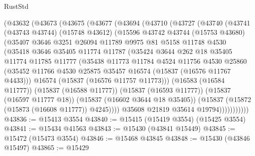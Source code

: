 \begin{lexlean}{RustStd}
\begin{coremodule}
{\begin{coremodule}
{{{{{{{{{{{{{{{{{{{{{{{{{{{{{{{{{{{{{{{{{{{{{{{{{{{{{{{{{{{{    (@43632
      (@43673
        (@43675
          (@43677
            (@43694
              (@43710
                (@43727
                  (@43740
                    (@43741
                      (@43743 @43744)
                      (@15748 @43612)
                      (@15596
                        @43742
                        @43744
                        (@15753 @43680)
                        (@35407
                          @3646
                          @3251
                          @26094
                          @11789
                          @9975
                          @81
                          @5158
                          @11748
                          @4530
                          (@35418
                            @3646
                            @35405
                            @11774
                            @11787
                            (@35424
                              @3644
                              @262
                              @18
                              @35405
                              @11774
                              @11785
                              @11777
                              (@35438
                                @11773
                                @11784
                                @4524
                                @11756
                                @4530
                                @25860
                                (@35452
                                  @11766
                                  @4530
                                  @25875
                                  @35457
                                  @16574
                                  (@15837 (@16576 @11767 @4433)))
                                @16574
                                (@15837 (@16576 @11757 @11773)))
                              (@16583 (@16584 @11777))
                              (@15837 (@16588 @11777))
                              (@15837 (@16593 @11777))
                              (@15837 (@16597 @11777 @18))
                              (@15837 (@16602 @3644 @18 @35405))
                              (@15837 (@15872 (@15873 (@16608 @11777)) @4245))))
                          @35608
                          @21819
                          @35614
                          @19794)))))))))))
@43836 := @15413 @3554
@43840 := @15415 (@15419 @3554) (@15425 @3554)
@43841 := @15434 @41563
@43843 := @15430 (@43841 @15449)
@43845 := @15472 (@15473 @3554)
@43846 := @15468 @43845
@43848 := @15430 (@43846 @15497)
@43865 := @15429
}}}}}}}}}}}}}}}}}}}}}}}}}}}}}}}}}}}}}}}}}}}}}}}}}}}}}}}}}}}}
\end{coremodule}}
\end{coremodule}
\end{lexlean}
